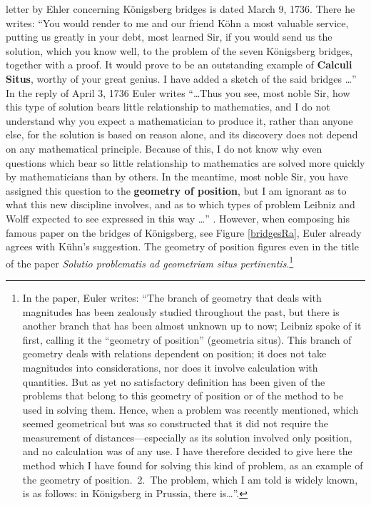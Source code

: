 \documentclass[12pt]{amsart}
\begin{document}
letter by Ehler concerning K\"onigsberg bridges is dated March 9, 1736. There
he writes: ``You would render to me and our friend K\"ohn a most valuable service, putting us greatly in your debt,
most learned Sir, if you would send us the solution, which you know well, to the
problem of the seven K\"onigsberg bridges, together with a proof.  It would prove to be an outstanding example
of {\bf Calculi Situs}, worthy of your great genius.  I have added a sketch of the said bridges \dots ''
In the reply of April 3, 1736 Euler writes ``\dots Thus you see,
most noble Sir, how this type of solution bears little relationship to
mathematics, and I do not understand why you expect a mathematician to produce it,
rather than anyone else, for the solution is based on reason alone, and its discovery does
not depend on any mathematical principle. Because of this,
I do not know why even questions which bear so little relationship to mathematics
are solved more quickly by mathematicians than by others. In the meantime,
most noble Sir, you have assigned this 
question to the {\bf geometry of position}, but I am ignorant as to what this new discipline
involves, and as to which types of problem Leibniz and Wolff expected to see expressed
in this way \dots '' \cite{H-W}.
However, when composing his famous paper on the bridges of K\"onigsberg, see Figure \ref{bridgesRa}, Euler
already agrees with K\"uhn's suggestion. The geometry of position figures even in the title of the
paper {\it Solutio problematis ad geometriam situs pertinentis}.\footnote{In the paper, Euler writes:
``The branch of geometry that deals with magnitudes has been zealously studied
throughout the past,  but there is another branch that has been almost
unknown up to now; Leibniz spoke of it first,  calling it the
``geometry of position'' (geometria situs).
This branch of geometry deals with relations dependent
on position; it does not take magnitudes into considerations, nor does it
involve calculation with quantities. But as yet no satisfactory definition
has been given of the problems that belong to this geometry of position
or of the method to be used in solving them. Hence, when a problem was recently mentioned,
which seemed geometrical but was so constructed that it did not require the measurement of
distances---especially as its solution involved only position, and no calculation
was of any use. I have therefore decided to give here the method which I have found for
solving this kind of problem, as an example of the geometry of position.\
2.\ The problem, which I am told is widely known, is as follows: in K\"onigsberg in Prussia,
there is\dots  ''\cite{Eu,BLW}.}
\end{document}
